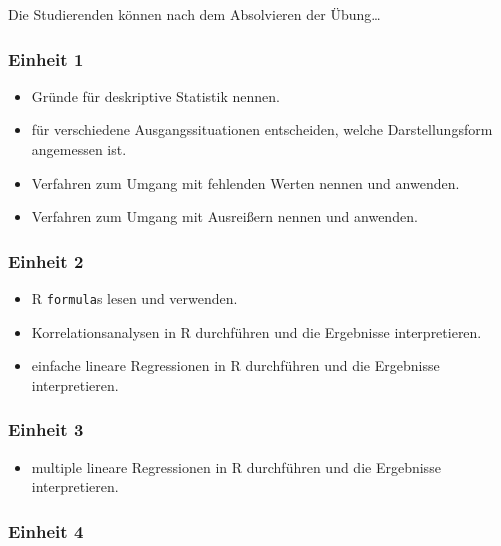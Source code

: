 \documentclass[
]{book}
\providecommand{\tightlist}{%
  \setlength{\itemsep}{0pt}\setlength{\parskip}{0pt}}
\begin{document}
Die Studierenden können nach dem Absolvieren der Übung\ldots{}

\hypertarget{einheit-1}{%
\subsubsection*{Einheit 1}\label{einheit-1}}

\begin{itemize}
\tightlist
\item
  Gründe für deskriptive Statistik nennen.
\item
  für verschiedene Ausgangssituationen entscheiden, welche Darstellungsform angemessen ist.
\item
  Verfahren zum Umgang mit fehlenden Werten nennen und anwenden.
\item
  Verfahren zum Umgang mit Ausreißern nennen und anwenden.
\end{itemize}

\hypertarget{einheit-2}{%
\subsubsection*{Einheit 2}\label{einheit-2}}

\begin{itemize}
\tightlist
\item
  R \texttt{formula}s lesen und verwenden.
\item
  Korrelationsanalysen in R durchführen und die Ergebnisse interpretieren.
\item
  einfache lineare Regressionen in R durchführen und die Ergebnisse interpretieren.
\end{itemize}

\hypertarget{einheit-3}{%
\subsubsection*{Einheit 3}\label{einheit-3}}

\begin{itemize}
\tightlist
\item
  multiple lineare Regressionen in R durchführen und die Ergebnisse interpretieren.
\end{itemize}

\hypertarget{einheit-4}{%
\subsubsection*{Einheit 4}\label{einheit-4}}
\end{document}
